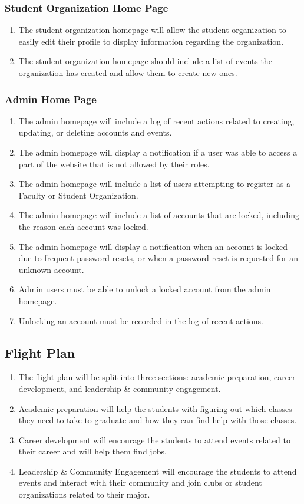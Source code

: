 		\subsubsection{Student Organization Home Page}
			\begin{enumerate}[leftmargin=3\parindent]
				\item The student organization homepage will allow the student organization to easily edit their profile to display information regarding the organization.
				\item The student organization homepage should include a list of events the organization has created and allow them to create new ones.
			\end{enumerate}
		\subsubsection{Admin Home Page}
			\begin{enumerate}[leftmargin=3\parindent]
				\item The admin homepage will include a log of recent actions related to creating, updating, or deleting accounts and events.
				\item The admin homepage will display a notification if a user was able to access a part of the website that is not allowed by their roles.
				\item The admin homepage will include a list of users attempting to register as a Faculty or Student Organization.
				\item The admin homepage will include a list of accounts that are locked, including the reason each account was locked.
				\item The admin homepage will display a notification when an account is locked due to frequent password resets, or when a password reset is requested for an unknown account.
				\item Admin users must be able to unlock a locked account from the admin homepage.
				\item Unlocking an account must be recorded in the log of recent actions.
			\end{enumerate}

\subsection{Flight Plan}
	\begin{enumerate}[leftmargin=3\parindent]
		\item The flight plan will be split into three sections: academic preparation, career development, and leadership \& community engagement. 
		\item Academic preparation will help the students with figuring out which classes they need to take to graduate and how they can find help with those classes.
		\item Career development will encourage the students to attend events related to their career and will help them find jobs.
		\item Leadership \& Community Engagement will encourage the students to attend events and interact with their community and join clubs or student organizations related to their major.
	\end{enumerate}

